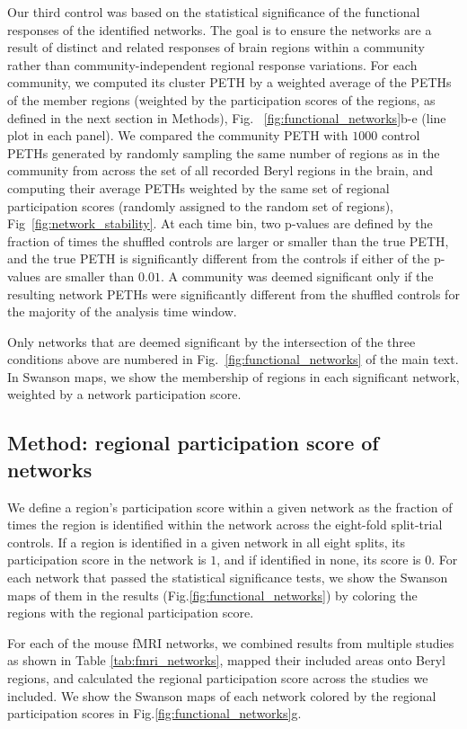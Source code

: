 Our third control was based on the statistical significance of the functional responses of the identified networks. The goal is to ensure the networks are a result of distinct and related responses of brain regions within a community rather than community-independent regional response variations. For each community, we computed its cluster PETH by a weighted average of the PETHs of the member regions (weighted by the participation scores of the regions, as defined in the next section in Methods), Fig. ~\ref{fig:functional_networks}b-e (line plot in each panel). We compared the community PETH with $1000$ control PETHs generated by randomly sampling the same number of regions as in the community from across the set of all recorded Beryl regions in the brain, and computing their average PETHs weighted by the same set of regional participation scores (randomly assigned to the random set of regions), Fig~\ref{fig:network_stability}. At each time bin, two p-values are defined by the fraction of times the shuffled controls are larger or smaller than the true PETH, and the true PETH is significantly different from the controls if either of the p-values are smaller than $0.01$. A community was deemed significant only if the resulting network PETHs were significantly different from the shuffled controls for the majority of the analysis time window.

Only networks that are deemed significant by the intersection of the three conditions above are numbered in Fig.~\ref{fig:functional_networks} of the main text. In Swanson maps, we show the membership of regions in each significant network, weighted by a network participation score. 

\subsection{Method: regional participation score of networks}
We define a region's participation score within a given network as the fraction of times the region is identified within the network across the eight-fold split-trial controls. If a region is identified in a given network in all eight splits, its participation score in the network is $1$, and if identified in none, its score is $0$.
For each network that passed the statistical significance tests, we show the Swanson maps of them in the results (Fig.\ref{fig:functional_networks}) by coloring the regions with the regional participation score. 

For each of the mouse fMRI networks, we combined results from multiple studies as shown in Table \ref{tab:fmri_networks}, mapped their included areas onto Beryl regions, and calculated the regional participation score across the studies we included. We show the Swanson maps of each network colored by the regional participation scores in Fig.\ref{fig:functional_networks}g.


